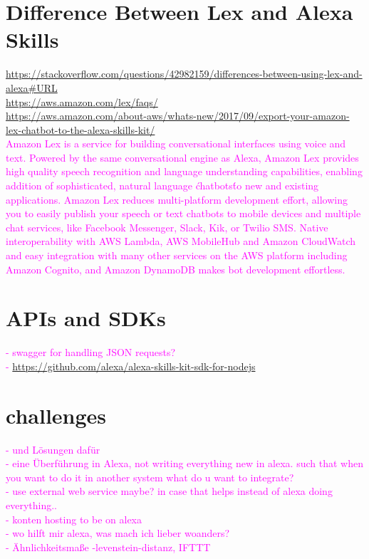\section{Difference Between Lex and Alexa Skills}  
\url{https://stackoverflow.com/questions/42982159/differences-between-using-lex-and-alexa#URL}\\
\url{https://aws.amazon.com/lex/faqs/}\\
\url{https://aws.amazon.com/about-aws/whats-new/2017/09/export-your-amazon-lex-chatbot-to-the-alexa-skills-kit/}\\
\textcolor{magenta}{Amazon Lex is a service for building conversational interfaces using voice and text. Powered by the same conversational engine as Alexa, Amazon Lex provides high quality speech recognition and language understanding capabilities, enabling addition of sophisticated, natural language \'chatbots\' to new and existing applications. Amazon Lex reduces multi-platform development effort, allowing you to easily publish your speech or text chatbots to mobile devices and multiple chat services, like Facebook Messenger, Slack, Kik, or Twilio SMS. Native interoperability with AWS Lambda, AWS MobileHub and Amazon CloudWatch and easy integration with many other services on the AWS platform including Amazon Cognito, and Amazon DynamoDB makes bot development effortless.}


\section{APIs and SDKs}

\textcolor{magenta}{
- swagger for handling JSON requests?\\
- \url{https://github.com/alexa/alexa-skills-kit-sdk-for-nodejs}
}

\section{challenges}

\textcolor{magenta}{
- und L\"osungen daf\"ur\\
- eine \"Uberf\"uhrung in Alexa, not writing everything new in alexa. such that when you want to do it in another system what do u want to integrate?\\
- use external web service maybe? in case that helps instead of alexa doing everything..\\
- konten hosting to be on alexa\\
- wo hilft mir alexa, was mach ich lieber woanders?\\
- \"Ahnlichkeitsma{\ss}e -levenstein-distanz, IFTTT
}
